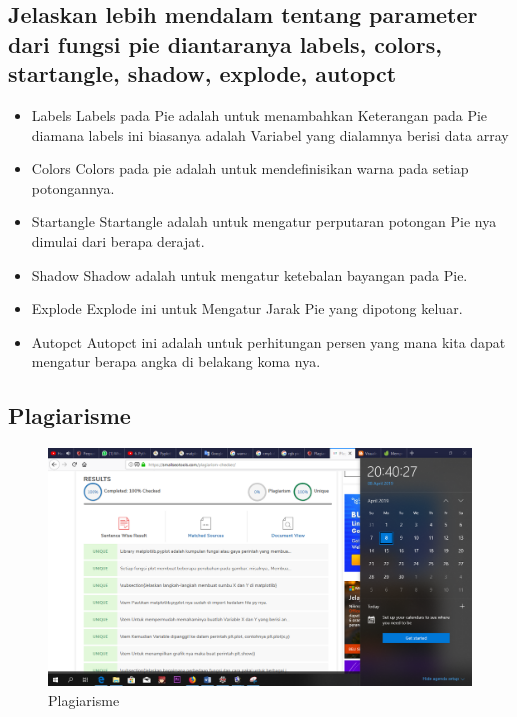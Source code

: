 \subsection{Jelaskan lebih mendalam tentang parameter dari fungsi pie diantaranya labels, colors, startangle, shadow, explode, autopct}
\begin{itemize}
	\item Labels\newline
	Labels pada Pie adalah untuk menambahkan Keterangan pada Pie diamana labels ini biasanya adalah Variabel yang dialamnya berisi data array
	\item Colors\newline
	Colors pada pie adalah untuk mendefinisikan warna pada setiap potongannya.
	\item Startangle\newline
	Startangle adalah untuk mengatur perputaran potongan Pie nya dimulai dari berapa derajat.
	\item Shadow\newline
	Shadow adalah untuk mengatur ketebalan bayangan pada Pie.
	\item Explode\newline
	Explode ini untuk Mengatur Jarak Pie yang dipotong keluar.
	\item Autopct\newline
	Autopct ini adalah untuk perhitungan persen yang mana kita dapat mengatur berapa angka di belakang koma nya. 
\end{itemize}

\subsection{Plagiarisme}
\begin{figure}[h]
\centering
\includegraphics[scale=0.2]{figures/6/Teori/1174002/8april.png}
\caption{Plagiarisme}
\label{fig:plagiat}
\end{figure}

